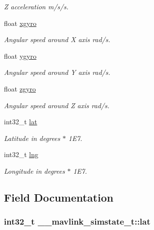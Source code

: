 \begin{DoxyCompactItemize}
\begin{DoxyCompactList}\small\item\em Z acceleration m/s/s. \end{DoxyCompactList}\item 
float \hyperlink{struct____mavlink__simstate__t_a46ce2cfef0c0307dcb3429242f22f036}{xgyro}
\begin{DoxyCompactList}\small\item\em Angular speed around X axis rad/s. \end{DoxyCompactList}\item 
float \hyperlink{struct____mavlink__simstate__t_ad5c386d5196b06c75c5e533a5edaa9ce}{ygyro}
\begin{DoxyCompactList}\small\item\em Angular speed around Y axis rad/s. \end{DoxyCompactList}\item 
float \hyperlink{struct____mavlink__simstate__t_aded04170674bab4dab87ad878d0131d4}{zgyro}
\begin{DoxyCompactList}\small\item\em Angular speed around Z axis rad/s. \end{DoxyCompactList}\item 
int32\+\_\+t \hyperlink{struct____mavlink__simstate__t_a17b5b685665772cb364270a98ec0952f}{lat}
\begin{DoxyCompactList}\small\item\em Latitude in degrees $\ast$ 1\+E7. \end{DoxyCompactList}\item 
int32\+\_\+t \hyperlink{struct____mavlink__simstate__t_a361b69e992a0ed42517e6d49c9b81912}{lng}
\begin{DoxyCompactList}\small\item\em Longitude in degrees $\ast$ 1\+E7. \end{DoxyCompactList}\end{DoxyCompactItemize}


\subsection{Field Documentation}
\hypertarget{struct____mavlink__simstate__t_a17b5b685665772cb364270a98ec0952f}{
\subsubsection[{lat}]{\setlength{\rightskip}{0pt plus 5cm}int32\+\_\+t \+\_\+\+\_\+mavlink\+\_\+simstate\+\_\+t\+::lat}}\label{struct____mavlink__simstate__t_a17b5b685665772cb364270a98ec0952f}


